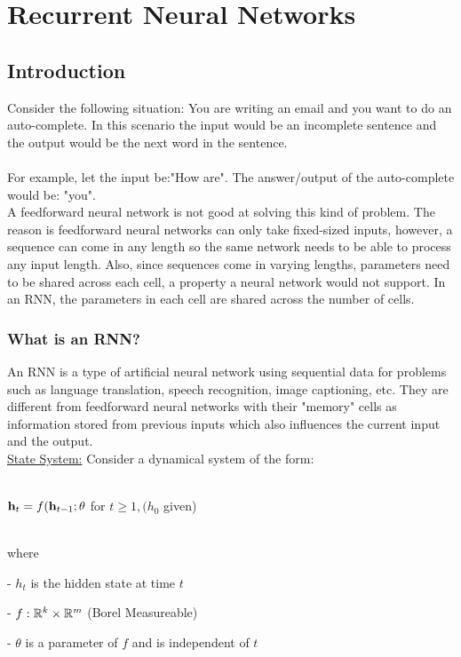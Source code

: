 
\chapter{Recurrent Neural Networks}

\section{Introduction}
\noindent Consider the following situation: You are writing an email and you want to do an auto-complete. In this scenario the input would be an incomplete sentence and the output would be the next word in the sentence.\\
\\For example, let the input be:"How are". The answer/output of the auto-complete would be: "you". \\


\noindent A feedforward neural network is not good at solving this kind of problem. The reason is feedforward neural networks can only take fixed-sized inputs, however, a sequence can come in any length so the same network needs to be able to process any input length. Also, since sequences come in varying lengths, parameters need to be shared across each cell, a property a neural network would not support. In an RNN, the parameters in each cell are shared across the number of cells.   \\

\subsection{What is an RNN?} 
 An RNN is a type of artificial neural network using sequential data for problems such as language translation, speech recognition, image captioning, etc. They are different from feedforward neural networks with their "memory" cells as information stored from previous inputs which also influences the current input and the output.  \\

\underline{State System:} Consider a dynamical system of the form:\\
\centerline{\\$\vh_t = f(\vh_{t-1}; \theta$ for $t \geq 1, (h_0 $ given)}
~\\ where 

- $h_t$ is the hidden state at time $t$

- $f: \R^{k} \times \R^{m}$    (Borel Measureable)

- $\theta $ is a parameter of $f$ and is independent of $t$ \\ \\ \\ \\ \\


